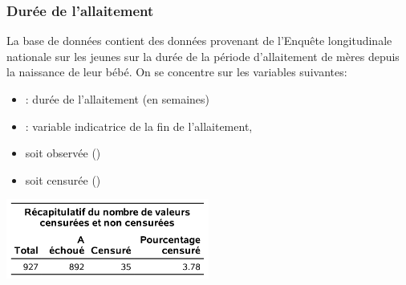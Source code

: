 \documentclass{beamer}
\begin{document}
\begin{frame}
\frametitle{Durée de l'allaitement}
La base de données  contient des données provenant de l'Enquête longitudinale nationale sur les jeunes sur la durée de la période d'allaitement de mères depuis la naissance de leur bébé. On se concentre sur les variables suivantes:
\begin{itemize}
\item {}: durée de l'allaitement (en semaines)
\item {}: variable indicatrice de la fin de l'allaitement, 
\bi \item soit observée () 
\item soit censurée ()
\ei

\end{itemize}
\begin{center}
\includegraphics[width = 0.5\textwidth]{img/c7/diapos7e09}
\end{center}
% 
\end{frame}
\end{document}
